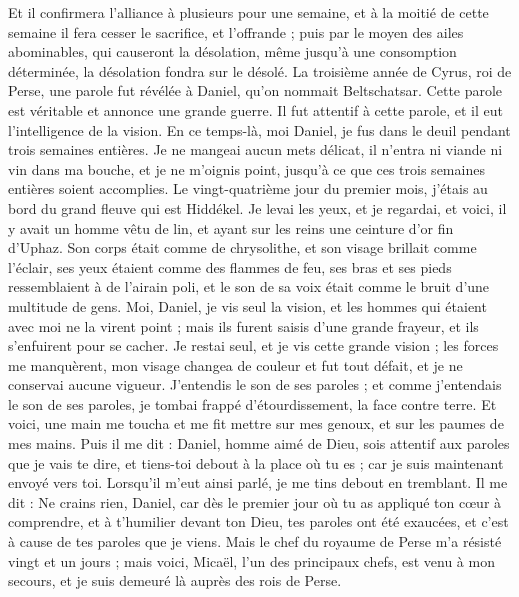 \begin{multicols}{2}
Et il confirmera l'alliance à plusieurs pour une semaine, et à la moitié de cette semaine il fera cesser le sacrifice, et l’offrande ; puis par le moyen des ailes abominables, qui causeront la désolation, même jusqu'à une consomption déterminée, la désolation fondra sur le désolé.
\VerseOne{}La troisième année de Cyrus, roi de Perse, une parole fut révélée à Daniel, qu’on nommait Beltschatsar. Cette parole est véritable et annonce une grande guerre.  Il fut attentif à cette parole, et il eut l’intelligence de la vision.
En ce temps-là, moi Daniel, je fus dans le deuil pendant trois semaines entières.
Je ne mangeai aucun mets délicat, il n'entra ni viande ni vin dans ma bouche, et je ne m'oignis point, jusqu'à ce que ces trois semaines entières soient accomplies.
Le vingt-quatrième jour du premier mois, j'étais au bord du grand fleuve qui est Hiddékel.
Je levai les yeux, et je regardai, et voici, il y avait  un homme vêtu de lin, et ayant sur les reins une ceinture d’or fin d'Uphaz.
Son corps était comme de chrysolithe, et son visage brillait comme l’éclair, ses yeux étaient comme des flammes de feu, ses bras et ses pieds ressemblaient à de l’airain poli, et le son de sa voix était comme le bruit d'une multitude de gens.
Moi, Daniel, je vis seul la vision, et les hommes qui étaient avec moi ne la virent point ; mais ils furent saisis d’une grande frayeur, et ils s'enfuirent pour se cacher.
Je restai seul, et je vis cette grande vision ; les forces me manquèrent, mon visage changea de couleur et fut tout défait, et je ne conservai aucune vigueur.
J’entendis  le son de ses paroles ; et comme j’entendais le son de ses paroles,  je tombai frappé d’étourdissement, la face contre terre.
Et voici, une main me toucha et me fit mettre sur mes genoux, et sur les paumes de mes mains.
Puis il me dit : Daniel, homme aimé de Dieu, sois attentif aux paroles que je vais te dire, et tiens-toi debout à la place où tu es ; car je suis maintenant envoyé vers toi. Lorsqu’il m'eut ainsi parlé, je me tins debout en tremblant.
Il me dit : Ne crains rien, Daniel, car dès le premier jour où tu as appliqué ton cœur à comprendre, et à t’humilier devant ton Dieu, tes paroles ont été exaucées, et c’est à cause de tes paroles que je viens.
Mais le chef du royaume de Perse m’a résisté vingt et un jours ; mais voici, Micaël, l'un des principaux chefs, est venu à mon secours, et je suis demeuré là auprès des rois de Perse.

\end{multicols}

